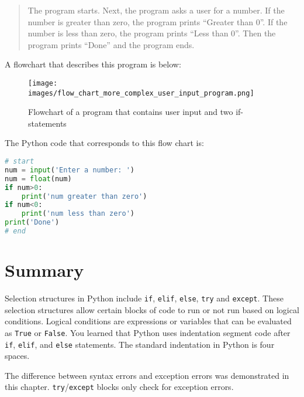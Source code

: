 \documentclass{book}
\makeatletter
\def\maxwidth{\ifdim\Gin@nat@width>\linewidth\linewidth
\else\Gin@nat@width\fi}
\let\Oldincludegraphics\includegraphics
\renewcommand{\includegraphics}[1]{\Oldincludegraphics[width=.8\maxwidth]{#1}}
\newcommand{\passthrough}[1]{#1}
\makeatother
\begin{document}
\begin{quote}
The program starts. Next, the program asks a user for a number. If the
number is greater than zero, the program prints ``Greater than 0''. If
the number is less than zero, the program prints ``Less than 0''. Then
the program prints ``Done'' and the program ends.
\end{quote}

A flowchart that describes this program is below:

\begin{figure}
\centering
\texttt{[image: images/flow\_chart\_more\_complex\_user\_input\_program.png]}
\caption{Flowchart of a program that contains user input and two
if-statements}
\end{figure}

The Python code that corresponds to this flow chart is:

\begin{lstlisting}[language=Python]
# start
num = input('Enter a number: ')
num = float(num)
if num>0:
    print('num greater than zero')
if num<0:
    print('num less than zero')
print('Done')
# end
\end{lstlisting}
    




    
        \newpage
        \hypertarget{summary}{%
\section{Summary}\label{summary}}

    




    
        Selection structures in Python include \passthrough{\lstinline!if!},
\passthrough{\lstinline!elif!}, \passthrough{\lstinline!else!},
\passthrough{\lstinline!try!} and \passthrough{\lstinline!except!}.
These selection structures allow certain blocks of code to run or not
run based on logical conditions. Logical conditions are expressions or
variables that can be evaluated as \passthrough{\lstinline!True!} or
\passthrough{\lstinline!False!}. You learned that Python uses
indentation segment code after \passthrough{\lstinline!if!},
\passthrough{\lstinline!elif!}, and \passthrough{\lstinline!else!}
statements. The standard indentation in Python is four spaces.

The difference between syntax errors and exception errors was
demonstrated in this chapter.
\passthrough{\lstinline!try!}/\passthrough{\lstinline!except!} blocks
only check for exception errors.
\end{document}
